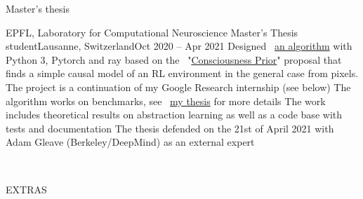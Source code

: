 \documentclass{resume} %
\newcommand*{\img}[1]{%
	\raisebox{-.02\baselineskip}{%
		\texttt{[image: \#1]}%
	}%
}
\newcommand*{\emoji}[1]{\img{./emoji/\imgpref#1.png}}
\newcommand*{\mybold}[1]{{\color{pinkunderline} #1}}
\def\imgpref{bleak-}
\newcommand{\mylink}{{\color{gray}\faExternalLink}}
\begin{document}
\begin{rSection}{Master's thesis}
	\begin{rSubsection}{EPFL, Laboratory for Computational Neuroscience \emoji{flag-ch}}{Master's Thesis student}{Lausanne, Switzerland}{Oct 2020 -- Apr 2021}
		\myitem Designed \mylink~\href{https://github.com/sergia-ch/causality-disentanglement-rl}{an algorithm} with \mybold{Python 3, Pytorch and ray} based on the \mylink~"\href{https://arxiv.org/abs/1709.08568}{Consciousness Prior}" proposal that finds a simple causal model of an RL environment in the general case from pixels. The project is a continuation of my Google Research internship (see below)
		\myitem The algorithm works on benchmarks, see \mylink~\href{https://sergia-ch.github.io/causality-simplicity/CauseOccam_Learning_Interpretable_Abstract_Representations_in_Reinforcement_Learning_Environments_via_Model_Sparsity.pdf}{my thesis} for more details
		\myitem The work includes \mybold{theoretical results on abstraction learning as well as a code base with tests and documentation}
		\myitem The thesis defended on the 21st of April 2021 with Adam Gleave (Berkeley/DeepMind) as an external expert
	\end{rSubsection}
\end{rSection}

\newpage
\newcommand{\middlewave}[1]{\begin{center} \mybold{\raisebox{0.5em}{\uwave{\hspace{#1}}}} \end{center} }
\,

\def\imgpref{}
\vspace{30pt}
\begin{center}
	\mybold{
		\middlewave{18cm}
		{\Huge \color{extrasG} EXTRAS
		} %
		\middlewave{18cm}
		\rfoot{Extra page \thepage \hspace{1pt} of 2}
		\setcounter{page}{1}
	}
\end{center}
\vspace{30pt}

\end{document}
